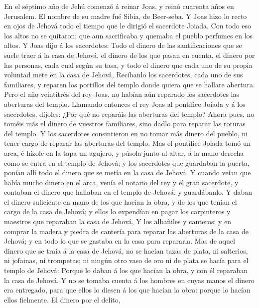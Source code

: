  En el séptimo año de Jehú comenzó á reinar Joas, y reinó
cuarenta años en Jerusalem. El nombre de su madre fué Sibia, de
Beer-seba.  Y Joas hizo lo recto en ojos de Jehová todo el
tiempo que le dirigió el sacerdote Joiada.  Con todo eso los
altos no se quitaron; que aun sacrificaba y quemaba el pueblo perfumes
en los altos.  Y Joas dijo á los sacerdotes: Todo el dinero
de las santificaciones que se suele traer á la casa de Jehová, el dinero
de los que pasan en cuenta, el dinero por las personas, cada cual según
su tasa, y todo el dinero que cada uno de su propia voluntad mete en la
casa de Jehová,  Recíbanlo los sacerdotes, cada uno de sus
familiares, y reparen los portillos del templo donde quiera que se
hallare abertura.  Pero el año veintitrés del rey Joas, no
habían aún reparado los sacerdotes las aberturas del templo.
 Llamando entonces el rey Joas al pontífice Joiada y á los
sacerdotes, díjoles: ¿Por qué no reparáis las aberturas del templo?
Ahora pues, no toméis más el dinero de vuestros familiares, sino dadlo
para reparar las roturas del templo.  Y los sacerdotes
consintieron en no tomar más dinero del pueblo, ni tener cargo de
reparar las aberturas del templo.  Mas el pontífice Joiada
tomó un arca, é hízole en la tapa un agujero, y púsola junto al altar, á
la mano derecha como se entra en el templo de Jehová; y los sacerdotes
que guardaban la puerta, ponían allí todo el dinero que se metía en la
casa de Jehová.  Y cuando veían que había mucho dinero en
el arca, venía el notario del rey y el gran sacerdote, y contaban el
dinero que hallaban en el templo de Jehová, y guardábanlo. 
Y daban el dinero suficiente en mano de los que hacían la obra, y de los
que tenían el cargo de la casa de Jehová; y ellos lo expendían en pagar
los carpinteros y maestros que reparaban la casa de Jehová,
 Y los albañiles y canteros; y en comprar la madera y
piedra de cantería para reparar las aberturas de la casa de Jehová; y en
todo lo que se gastaba en la casa para repararla.  Mas de
aquel dinero que se traía á la casa de Jehová, no se hacían tazas de
plata, ni salterios, ni jofainas, ni trompetas; ni ningún otro vaso de
oro ni de plata se hacía para el templo de Jehová:  Porque
lo daban á los que hacían la obra, y con él reparaban la casa de Jehová.
 Y no se tomaba cuenta á los hombres en cuyas manos el
dinero era entregado, para que ellos lo diesen á los que hacían la obra:
porque lo hacían ellos fielmente.  El dinero por el delito,
